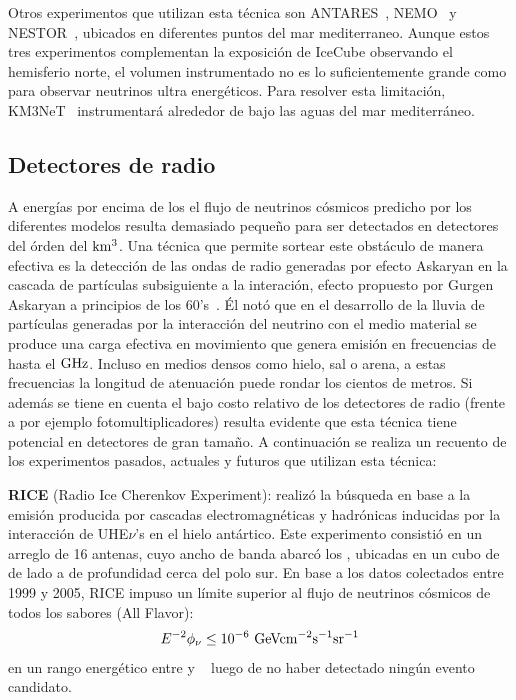 	Otros experimentos que utilizan esta t\'ecnica son ANTARES~\cite{cite:Antares1}, NEMO~\cite{cite:Nemo1} y NESTOR~\cite{cite:Nestor1}, ubicados en diferentes puntos del mar mediterraneo.
	Aunque estos tres experimentos complementan la exposici\'on de IceCube observando el hemisferio norte, el volumen instrumentado no es lo suficientemente grande como para observar neutrinos ultra energ\'eticos.
	Para resolver esta limitaci\'on, KM3NeT~\cite{cite:km3Net1} instrumentar\'a alrededor de  bajo las aguas del mar mediterr\'aneo.
	
	\subsection{Detectores de radio}
	A energ\'ias por encima de los  el flujo de neutrinos c\'osmicos predicho por los diferentes modelos resulta demasiado peque\~no para ser detectados en detectores del \'orden del $\rm km^3$. 
	Una t\'ecnica que permite sortear este obst\'aculo de manera efectiva es la detecci\'on de las ondas de radio generadas por efecto Askaryan en la cascada de part\'iculas subsiguiente a la interaci\'on, efecto propuesto por Gurgen Askaryan a principios de los 60's~\cite{cite:Askaryan}.
	\'El not\'o que en el desarrollo de la lluvia de part\'iculas generadas por la interacci\'on del neutrino con el medio material se produce una carga efectiva en movimiento que genera emisi\'on \cher{} en frecuencias de hasta el $\rm GHz$.
	Incluso en medios densos como hielo, sal o arena, a estas frecuencias la longitud de atenuaci\'on puede rondar los cientos de metros.
	Si adem\'as se tiene en cuenta el bajo costo relativo de los detectores de radio (frente a por ejemplo fotomultiplicadores) resulta evidente que esta t\'ecnica tiene potencial en detectores de gran tama\~no.
	A continuaci\'on se realiza un recuento de los experimentos pasados, actuales y futuros que utilizan esta t\'ecnica:
	
	\textbf{RICE} (Radio Ice Cherenkov Experiment): realiz\'o la b\'usqueda en base a la emisi\'on producida por cascadas electromagn\'eticas y hadr\'onicas inducidas por la interacci\'on de UHE$\nu$'s en el hielo ant\'artico.
	Este experimento consisti\'o en un arreglo de 16 antenas, cuyo ancho de banda abarc\'o los , ubicadas en un cubo de  de lado a  de profundidad cerca del polo sur.
	En base a los datos colectados entre 1999 y 2005, RICE impuso un l\'imite superior al flujo de neutrinos c\'osmicos de todos los sabores (All Flavor):
	\begin{equation}
	 E^{-2}\phi_\nu \leq 10^{-6}{\rm\ GeVcm^{-2}s^{-1}sr^{-1}}
	\end{equation}
	en un rango energ\'etico entre  y ~\cite{cite:RICE} luego de no haber detectado ning\'un evento candidato.
	 
